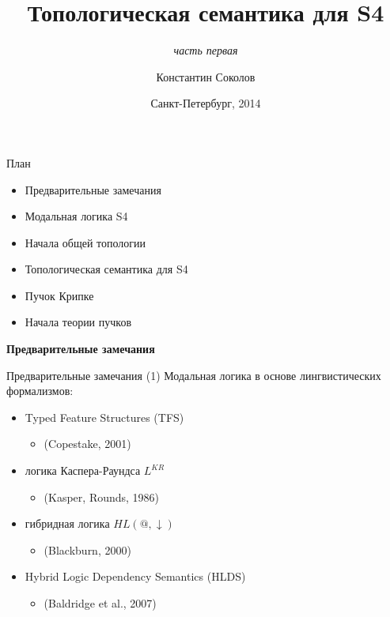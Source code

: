 \documentclass{beamer}
\begin{document}
\title{\Large{Топологическая семантика для S4}}
\subtitle{\textit{часть первая}}
\author{Константин Соколов}
\date{Санкт-Петербург, 2014} 
\begin{frame}
    \thispagestyle{empty}
    \titlepage
\end{frame}

\begin{frame}{План}
    \setcounter{framenumber}{1}
    \begin{itemize}
    	\item Предварительные замечания
    	\item Модальная логика S4
        \item Начала общей топологии
        \item Топологическая семантика для S4
        \item Пучок Крипке
        \item Начала теории пучков
    \end{itemize}
\end{frame}

\begin{frame}{}
\begin{center}
	\textbf{Предварительные замечания}
\end{center}
\end{frame}

\begin{frame}{Предварительные замечания (1)}
Модальная логика в основе лингвистических формализмов:\\
\bigskip
\begin{itemize}
	\item Typed Feature Structures (TFS)
		\begin{itemize}
			\item (Copestake, 2001) 
		\end{itemize}
	\item логика Каспера-Раундса $L^{KR}$
		\begin{itemize}
			\item (Kasper, Rounds, 1986)
		\end{itemize}
	\item гибридная логика $HL(@, \downarrow)$
		\begin{itemize}
			\item (Blackburn, 2000)
		\end{itemize}
	\item Hybrid Logic Dependency Semantics (HLDS)
		\begin{itemize}
			\item (Baldridge et al., 2007)
		\end{itemize}
\end{itemize}
\end{frame}
\end{document}
